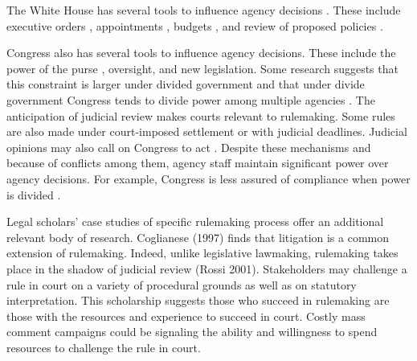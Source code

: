 
The White House has several tools to influence agency decisions \citep{Yackee2009RegGov,Simon1954}. These include executive orders \citep{Mayer1999}, appointments \citep{Doherty2014,Lewis2008,Wood1988}, budgets \citep{Whittington2003}, and review of proposed policies \citep{Haeder2015, Acs2013}. 

Congress also has several tools to influence agency decisions. These include the power of the purse \citep{Fenno1986,Bolton2015}, oversight, and new legislation. Some research suggests that this constraint is larger under divided government \citep{Yackee2009RegGov} %
and that under divide government Congress tends to divide power among multiple agencies \citep{Farhang2016}.
The anticipation of judicial review makes courts relevant to rulemaking. Some rules are also made under court-imposed settlement or with judicial deadlines. Judicial opinions may also call on Congress to act \citep{Yaver2017}.
Despite these mechanisms and because of conflicts among them, agency staff maintain significant power over agency decisions. For example, Congress is less assured of compliance when power is divided \citep{Yaver2016}.

Legal scholars' case studies of specific rulemaking process offer an additional relevant body of research. %
Coglianese (1997) finds that litigation is a common extension of rulemaking. Indeed, unlike legislative lawmaking, rulemaking takes place in the shadow of judicial review (Rossi 2001). %
Stakeholders may challenge a rule in court on a variety of procedural grounds as well as on statutory interpretation. This scholarship suggests those who succeed in rulemaking are those with the resources and experience to succeed in court. Costly mass comment campaigns could be signaling the ability and willingness to spend resources to challenge the rule in court. 

